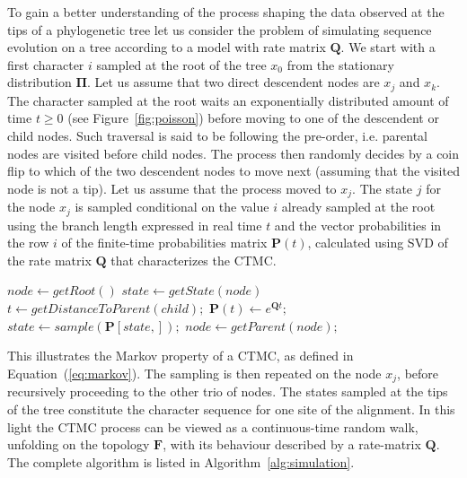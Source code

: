 To gain a better understanding of the process shaping the data observed at the tips of a phylogenetic tree let us consider the problem of simulating sequence evolution on a tree according to a model with rate matrix $\mathbf{Q}$.
We start with a first character $i$ sampled at the root of the tree $x_0$ from the stationary distribution $\mathbf{\Pi}$.
Let us assume that two direct descendent nodes are $x_j$ and $x_k$.
The character sampled at the root waits an exponentially distributed amount of time $t\geq0$ (see Figure~\ref{fig:poisson}) before moving to one of the descendent or child nodes.
Such traversal is said to be following the pre-order, i.e. parental nodes are visited before child nodes.   
The process then randomly decides by a coin flip to which of the two descendent nodes to move next (assuming that the visited node is not a tip).
Let us assume that the process moved to $x_j$.
The state $j$ for the node $x_j$ is sampled conditional on the value $i$ already sampled at the root using the branch length expressed in real time $t$ and the vector probabilities in the row $i$ of the finite-time probabilities matrix $\mathbf{P}(t)$, calculated using SVD of the rate matrix $\mathbf{Q}$ that characterizes the CTMC.   

\begin{algorithm}[h!]
\centering
\begin{algorithmic}[1]
%
\State $node \gets getRoot\left(\right)$
%
\State $state \gets getState\left(node\right)$
%
\Repeat
%
%
%
\State $t \gets getDistanceToParent\left(child\right);$
%
\State $ \mathbf{P}\left(t\right) \gets e^{\mathbf{Q}t};$
%
\State $state \gets sample\left(\mathbf{P}\left[ state, \right]\right);$
%
\EndFor
%
\Else {}
%
\State $node \gets getParent\left(node\right);$
%
\EndIf
%
\end{algorithmic}
\caption{
{ \footnotesize 
{\bf Pseudo code for simulating an evolutionary process along a phylogeny.} 
When a child node is visited, the state is sampled with conditional probabilities of changing to state $j$ given state $i$ at the parental node.
}%
}
\label{alg:simulation}
\end{algorithm}

This illustrates the Markov property of a CTMC, as defined in Equation~(\ref{eq:markov}).
The sampling is then repeated on the node $x_j$, before recursively proceeding to the other trio of nodes.
The states sampled at the tips of the tree constitute the character sequence for one site of the alignment.
In this light the CTMC process can be viewed as a continuous-time random walk, unfolding on the topology $\mathbf{F}$, with its behaviour described by a rate-matrix $\mathbf{Q}$.
The complete algorithm is listed in Algorithm~\ref{alg:simulation}.

